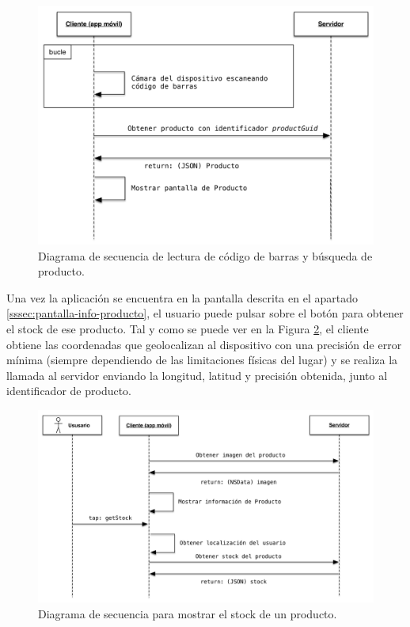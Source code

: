 \begin{figure}[H]
	\centering
		\includegraphics[width=1\textwidth]{./img/diagrama-camara.png}
	\caption{Diagrama de secuencia de lectura de código de barras y búsqueda de producto.}
	\label{fig:diagrama-camara}
\end{figure}

Una vez la aplicación se encuentra en la pantalla descrita en el apartado \ref{sssec:pantalla-info-producto}, el usuario puede pulsar sobre el botón para obtener el stock de ese producto. Tal y como se puede ver en la Figura \ref{fig:diagrama-get-stock}, el cliente obtiene las coordenadas que geolocalizan al dispositivo con una precisión de error mínima (siempre dependiendo de las limitaciones físicas del lugar) y se realiza la llamada al servidor enviando la longitud, latitud y precisión obtenida, junto al identificador de producto.

\begin{figure}[H]
	\centering
		\includegraphics[width=1\textwidth]{./img/diagrama-get-stock.png}
	\caption{Diagrama de secuencia para mostrar el stock de un producto.}
	\label{fig:diagrama-get-stock}
\end{figure}

